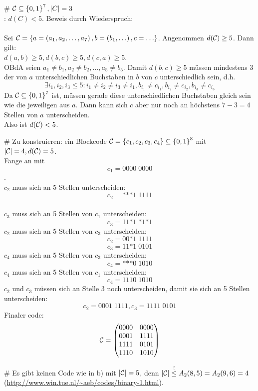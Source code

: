 \begin{myList}
# $\mathcal{C} \subseteq\left\lbrace 0,1 \right\rbrace^7, |C|=3$\\
\ZZ: $d(C)< 5$. Beweis durch Wiederspruch:\\\\
Sei $\mathcal{C}=\left\lbrace a=\left( a_1, a_2,\ldots, a_7 \right), b=\left( b_1, \ldots \right), c=\ldots \right\rbrace$. Angenommen $d(\mathcal{C})\geq 5$. Dann gilt:\\
$d(a, b)\geq 5, d(b, c)\geq 5, d(c, a)\geq 5$.\\
OBdA seien $a_1\not=b_1, a_2\not=b_2, \ldots, a_5\not= b_5$. Damit $d(b, c)\geq 5$ müssen mindestens 3 der von $a$ unterschiedlichen Buchstaben in $b$ von $c$ unterschiedlich sein, d.h.
$$\exists i_1, i_2, i_3 \leq 5: i_1\not=i_2\not=i_3\not=i_1, b_{i_1}\not= c_{i_1},   b_{i_2}\not= c_{i_2},   b_{i_3}\not= c_{i_3} $$
Da $\mathcal{C}\subseteq\left\lbrace 0, 1 \right\rbrace^7$ ist, müssen gerade diese unterschiedlichen Buchstaben gleich sein wie die jeweiligen aus $a$. Dann kann sich $c$ aber nur noch an höchstens $7-3=4$ Stellen von $a$ unterscheiden. \\
Also ist $d(\mathcal{C})< 5$.

# Zu konstruieren: ein Blockcode $\mathcal{C}=\left\lbrace c_1, c_2, c_3, c_4 \right\rbrace\subseteq\left\lbrace 0,1 \right\rbrace^8$ mit $|\mathcal{C}|=4, d(\mathcal{C})=5$.   \\
Fange an mit $$c_1=0000\;0000$$.\\
$c_2$ muss sich an 5 Stellen unterscheiden: $$c_2= \mbox{*}\mbox{*}\mbox{*}1\;1111$$\\
$c_3$ muss sich an 5 Stellen von $c_1$ unterscheiden: $$c_3=11\mbox{*}1\;\mbox{*}1\mbox{*}1$$
$c_2$ muss sich an 5 Stellen von $c_3$ unterscheiden: $$c_2=00\mbox{*}1\;1111$$
$$c_3=11\mbox{*}1\;0101$$
$c_4$ muss sich an 5 Stellen von $c_3$ unterscheiden:
$$c_4=\mbox{*}\mbox{*}\mbox{*}0\;1010$$
$c_4$ muss sich an 5 Stellen von $c_1$ unterscheiden:
$$c_4=1110\;1010$$
$c_2$ und $c_3$ müssen sich an Stelle 3 noch unterscheiden, damit sie sich an 5 Stellen unterscheiden:
$$c_2=0001\;1111, c_3=1111\;0101$$
Finaler code:
$$\mathcal{C}=\begin{pmatrix}
0000&0000\\
0001&1111\\
1111&0101\\
1110&1010
\end{pmatrix}$$

# Es gibt keinen Code wie in b) mit $|\mathcal{C}|=5$, denn $|\mathcal{C}|\overset ! \leq A_2(8, 5) = A_2(9, 6) = 4$ \\(\url{http://www.win.tue.nl/~aeb/codes/binary-1.html}).
\end{myList}

